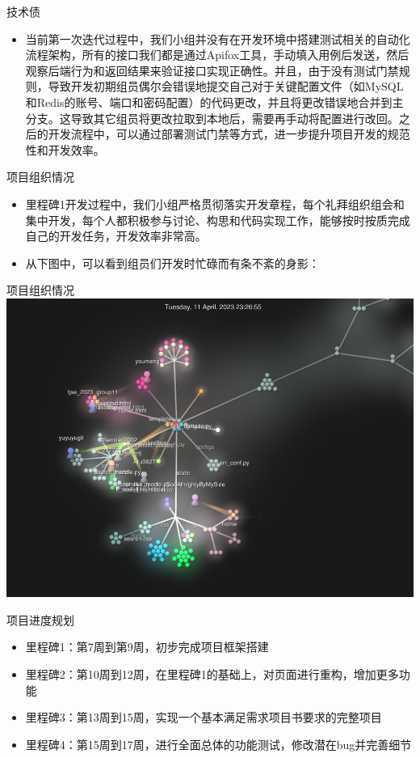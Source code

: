 \begin{frame}{技术债}
    \begin{itemize}
        \item 当前第一次迭代过程中，我们小组并没有在开发环境中搭建测试相关的自动化流程架构，所有的接口我们都是通过Apifox工具，手动填入用例后发送，然后观察后端行为和返回结果来验证接口实现正确性。并且，由于没有测试门禁规则，导致开发初期组员偶尔会错误地提交自己对于关键配置文件（如MySQL和Redis的账号、端口和密码配置）的代码更改，并且将更改错误地合并到主分支。这导致其它组员将更改拉取到本地后，需要再手动将配置进行改回。之后的开发流程中，可以通过部署测试门禁等方式，进一步提升项目开发的规范性和开发效率。
    \end{itemize}
\end{frame}

\begin{frame}{项目组织情况}
    \begin{itemize}
        \item 里程碑1开发过程中，我们小组严格贯彻落实开发章程，每个礼拜组织组会和集中开发，每个人都积极参与讨论、构思和代码实现工作，能够按时按质完成自己的开发任务，开发效率非常高。
        \item 从下图中，可以看到组员们开发时忙碌而有条不紊的身影：
    \end{itemize}
\end{frame}

\begin{frame}{项目组织情况}
    \includegraphics[width=1\textwidth]{contents/figure/commits.png}
\end{frame}

\begin{frame}{项目进度规划}
    \begin{itemize}
        \item 里程碑1：第7周到第9周，初步完成项目框架搭建
        \item 里程碑2：第10周到12周，在里程碑1的基础上，对页面进行重构，增加更多功能
        \item 里程碑3：第13周到15周，实现一个基本满足需求项目书要求的完整项目
        \item 里程碑4：第15周到17周，进行全面总体的功能测试，修改潜在bug并完善细节
    \end{itemize}
\end{frame}